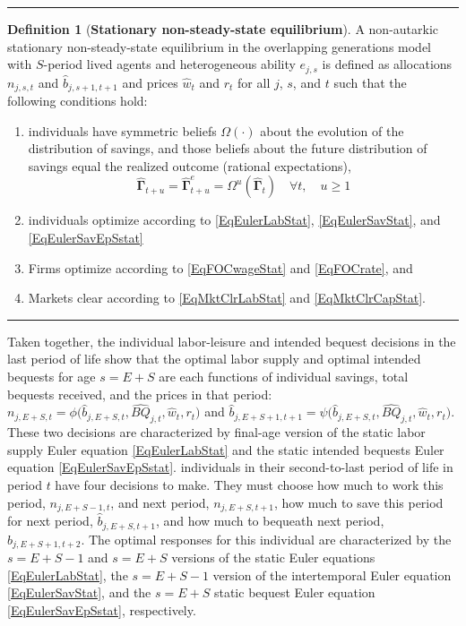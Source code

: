 \documentclass[letterpaper,12pt]{article}
\theoremstyle{definition}
\newtheorem{definition}{Definition} %
\begin{document}
  \hrule
  \begin{definition}[\textbf{Stationary non-steady-state equilibrium}]\label{DefEquilNonSS}
    A non-autarkic stationary non-steady-state equilibrium in the overlapping generations model with $S$-period lived agents and heterogeneous ability $e_{j,s}$ is defined as allocations $n_{j,s,t}$ and $\hat{b}_{j,s+1,t+1}$ and prices $\hat{w}_t$ and $r_t$ for all $j$, $s$, and $t$ such that the following conditions hold:
     \begin{enumerate}
        \item individuals have symmetric beliefs $\Omega(\cdot)$ about the evolution of the distribution of savings, and those beliefs about the future distribution of savings equal the realized outcome (rational expectations),
          \begin{equation*}
            \bm{\hat{\Gamma}}_{t+u} = \bm{\hat{\Gamma}}^e_{t+u} = \Omega^u\left( \bm{\hat{\Gamma}}_t\right) \quad\forall t, \quad u\geq 1
          \end{equation*}
        \item individuals optimize according to \eqref{EqEulerLabStat}, \eqref{EqEulerSavStat}, and \eqref{EqEulerSavEpSstat}
        \item Firms optimize according to \eqref{EqFOCwageStat} and \eqref{EqFOCrate}, and
        \item Markets clear according to \eqref{EqMktClrLabStat} and \eqref{EqMktClrCapStat}.
     \end{enumerate}
  \end{definition}
  \hrule

  \vspace{10mm}

  \noindent Taken together, the individual labor-leisure and intended bequest decisions in the last period of life show that the optimal labor supply and optimal intended bequests for age $s=E+S$ are each functions of individual savings, total bequests received, and the prices in that period: $n_{j,E+S,t}=\phi\bigl(\hat{b}_{j,E+S,t},\hat{BQ}_{j,t},\hat{w}_t,r_t\bigr)$ and $\hat{b}_{j,E+S+1,t+1}=\psi\bigl(\hat{b}_{j,E+S,t},\hat{BQ}_{j,t},\hat{w}_t,r_t\bigr)$. These two decisions are characterized by final-age version of the static labor supply Euler equation \eqref{EqEulerLabStat} and the static intended bequests Euler equation \eqref{EqEulerSavEpSstat}. individuals in their second-to-last period of life in period $t$ have four decisions to make. They must choose how much to work this period, $n_{j,E+S-1,t}$, and next period, $n_{j,E+S,t+1}$, how much to save this period for next period, $\hat{b}_{j,E+S,t+1}$, and how much to bequeath next period, $\hat{b}_{j,E+S+1,t+2}$. The optimal responses for this individual are characterized by the $s=E+S-1$ and $s=E+S$ versions of the static Euler equations \eqref{EqEulerLabStat}, the $s=E+S-1$ version of the intertemporal Euler equation \eqref{EqEulerSavStat}, and the $s=E+S$ static bequest Euler equation \eqref{EqEulerSavEpSstat}, respectively.
\end{document}

